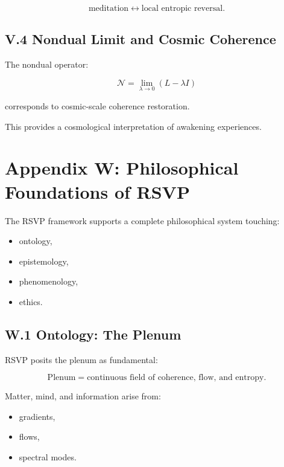 \documentclass[12pt]{article}
\begin{document}
\[
\text{meditation} \leftrightarrow \text{local entropic reversal}.
\]

\subsection*{V.4 Nondual Limit and Cosmic Coherence}

The nondual operator:

\[
\mathcal{N}
=
\lim_{\lambda\to 0} (L-\lambda I)
\]

corresponds to cosmic-scale coherence restoration.

This provides a cosmological interpretation of awakening experiences.


\section*{Appendix W: Philosophical Foundations of RSVP}

The RSVP framework supports a complete philosophical system touching:

\begin{itemize}
\item ontology,
\item epistemology,
\item phenomenology,
\item ethics.
\end{itemize}

\subsection*{W.1 Ontology: The Plenum}

RSVP posits the plenum as fundamental:

\[
\text{Plenum} = \text{continuous field of coherence, flow, and entropy}.
\]

Matter, mind, and information arise from:

\begin{itemize}
\item gradients,
\item flows,
\item spectral modes.
\end{itemize}
\end{document}
